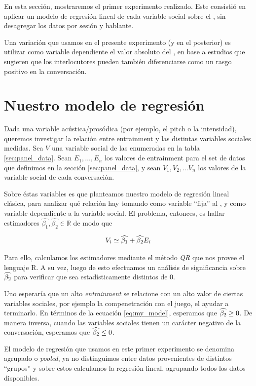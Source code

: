 En esta sección, mostraremos el primer experimento realizado. Este consistió en aplicar un modelo de regresión lineal de cada variable social sobre el \entrainment, sin desagregar los datos por sesión y hablante.

Una variación que usamos en el presente experimento (y en el posterior) es utilizar como variable dependiente el valor absoluto del \entrainment, en base a estudios que sugieren que los interlocutores pueden también diferenciarse como un rasgo positivo en la conversación.

\section{Nuestro modelo de regresión}

Dada una variable acústica/prosódica (por ejemplo, el pitch o la intensidad), queremos investigar la relación entre entrainment y las distintas variables sociales medidas. Sea $V$ una variable social de las enumeradas en la tabla \ref{sec:panel_data}. Sean $E_1, \ldots, E_n$ los valores de entrainment para el set de datos que definimos en la sección \ref{sec:panel_data}, y sean $V_1, V_2, \ldots V_n$ los valores de la variable social de cada conversación.

Sobre éstas variables es que planteamos nuestro modelo de regresión lineal clásica, para analizar qué relación hay tomando como variable ``fija'' al \entrainment, y como variable dependiente a la variable social. El problema, entonces, es hallar estimadores $\widehat{\beta_1}, \widehat{\beta_2} \in \mathbb{R}$ de modo que

\begin{equation}
  V_i \simeq \widehat{\beta_1} + \widehat{\beta_2} E_i
  \label{eq:my_model}
\end{equation}


Para ello, calculamos los estimadores mediante el método \emph{QR} que nos provee el lenguaje R. A su vez, luego de esto efectuamos un análisis de significancia sobre $\widehat{\beta_2}$ para verificar que sea estadísticamente distintos de 0.

Uno esperaría que un alto \emph{entrainment} se relacione con un alto valor de ciertas variables sociales, por ejemplo la compenetración con el juego, el ayudar a terminarlo. En términos de la ecuación \ref{eq:my_model}, esperamos que $\widehat{\beta_2} \geq 0$. De manera inversa, cuando las variables sociales tienen un carácter negativo de la conversación, esperamos que $\widehat{\beta_2} \leq 0$.


El modelo de regresión que usamos en este primer experimento se denomina agrupado o \emph{pooled}, ya no distinguimos entre datos provenientes de distintos ``grupos'' \cite{gujarati1999} y sobre estos calculamos la regresión lineal, agrupando todos los datos disponibles.

